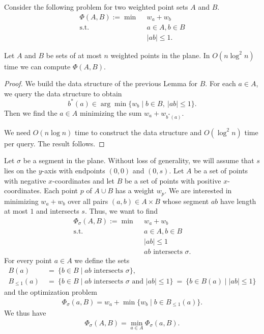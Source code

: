 \documentclass[a4paper,USenglish,numberwithinsect]{lipics}
\let\le\leqslant
\begin{document}
Consider the following problem for two weighted point sets $A$ and $B$.
\begin{align*}
	\Phi(A,B) :=\min ~~		& w_a+w_b\\
	 \mbox{s.t.}~~ & a \in A, b\in B\\
				&	|ab|\le 1. 
\end{align*}

\begin{lemma}
\label{le:within}
	Let $A$ and $B$ be sets of at most $n$ weighted points in the plane.
	In $O(n\log^2 n)$ time we can compute $\Phi(A,B)$.
\end{lemma}
\begin{proof}
	We build the data structure of the previous Lemma for $B$.
	For each $a\in A$, we query the data structure to obtain
	\[	
		b^*(a) \in \arg\min \{ w_b \mid b\in B,~|ab|\le 1\}.
	\]
	Then we find the $a\in A$ minimizing the sum $w_a+w_{b^*(a)}$.	

	We need $O(n\log n)$ time to construct the data structure and 
	$O(\log^2 n)$ time per query. The result follows.
\end{proof}


Let $\sigma$ be a segment in the plane. 
Without loss of generality, we will assume that $s$ lies on
the $y$-axis with endpoints $(0,0)$ and $(0,s)$.
Let $A$ be a set of points with negative $x$-coordinates 
and let $B$ be a set of points with positive $x$-coordinates.
Each point $p$ of $A\cup B$ has a weight $w_p$.
We are interested in minimizing $w_a+w_b$ over all pairs $(a,b)\in A\times B$
whose segment $ab$ have length at most $1$ and intersects $s$.
Thus, we want to find
\begin{align*}
	\Phi_\sigma(A,B) :=\min ~~		& w_a+w_b\\
	 \mbox{s.t.}~~ & a\in A, b\in B\\
				&	|ab|\le 1\\
				&	\mbox{$ab$ intersects $\sigma$}. 
\end{align*}
For every point $a\in A$ we define the sets
\begin{align*}
	B(a)~&=~\{ b\in B\mid \text{$ab$ intersects $\sigma$}\},\\
	B_{\le 1}(a)~&=~ \{ b\in B\mid \text{$ab$ intersects $\sigma$ and $|ab|\le 1$}\} 
			~=~ \{ b\in B(a)\mid |ab|\le 1\}
\end{align*}
and the optimization problem
\begin{align*}
	\Phi_\sigma(a,B) = w_a + \min \{ w_b\mid b\in B_{\le 1}(a)\}.
\end{align*}
We thus have
\begin{align*}
	\Phi_\sigma(A,B) = \min_{a\in A} \Phi_\sigma(a,B).
\end{align*}
\end{document}
